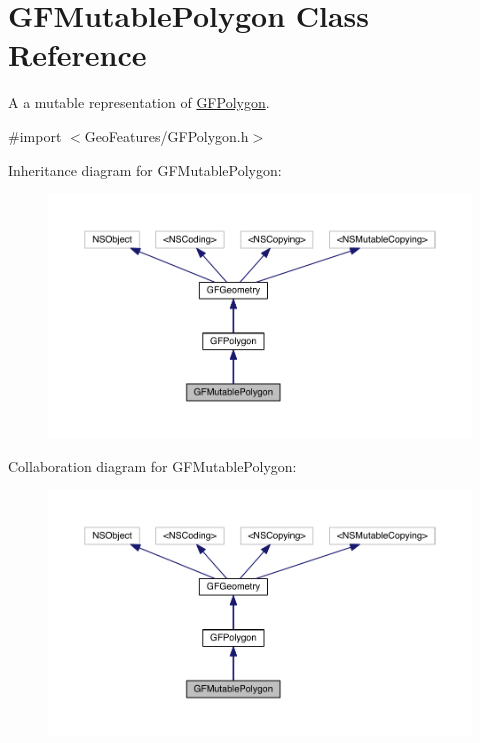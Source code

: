 \hypertarget{interface_g_f_mutable_polygon}{}\section{G\+F\+Mutable\+Polygon Class Reference}
\label{interface_g_f_mutable_polygon}


A a mutable representation of \hyperlink{interface_g_f_polygon}{G\+F\+Polygon}.  




{\ttfamily \#import $<$Geo\+Features/\+G\+F\+Polygon.\+h$>$}



Inheritance diagram for G\+F\+Mutable\+Polygon\+:\nopagebreak
\begin{figure}[H]
\begin{center}
\leavevmode
\includegraphics[width=350pt]{interface_g_f_mutable_polygon__inherit__graph}
\end{center}
\end{figure}


Collaboration diagram for G\+F\+Mutable\+Polygon\+:\nopagebreak
\begin{figure}[H]
\begin{center}
\leavevmode
\includegraphics[width=350pt]{interface_g_f_mutable_polygon__coll__graph}
\end{center}
\end{figure}

